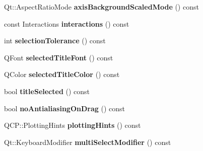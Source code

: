 \begin{DoxyCompactItemize}
\item 
\hypertarget{classQCustomPlot_a80263246f60d954ad9f1df619771d37d}{Qt\-::\-Aspect\-Ratio\-Mode {\bfseries axis\-Background\-Scaled\-Mode} () const }\label{classQCustomPlot_a80263246f60d954ad9f1df619771d37d}

\item 
\hypertarget{classQCustomPlot_aafa69792f314035ef07b8d652db9e503}{const Interactions {\bfseries interactions} () const }\label{classQCustomPlot_aafa69792f314035ef07b8d652db9e503}

\item 
\hypertarget{classQCustomPlot_a7b738074c75e80070ef6a10263c6cd69}{int {\bfseries selection\-Tolerance} () const }\label{classQCustomPlot_a7b738074c75e80070ef6a10263c6cd69}

\item 
\hypertarget{classQCustomPlot_acae05eac007969abfb8221625e4f2ab2}{Q\-Font {\bfseries selected\-Title\-Font} () const }\label{classQCustomPlot_acae05eac007969abfb8221625e4f2ab2}

\item 
\hypertarget{classQCustomPlot_a3ebc2edf63e784efe67f1873eafe8d02}{Q\-Color {\bfseries selected\-Title\-Color} () const }\label{classQCustomPlot_a3ebc2edf63e784efe67f1873eafe8d02}

\item 
\hypertarget{classQCustomPlot_a587e5d3000d2167f38fea124236082e2}{bool {\bfseries title\-Selected} () const }\label{classQCustomPlot_a587e5d3000d2167f38fea124236082e2}

\item 
\hypertarget{classQCustomPlot_ae07f2895a34d13a97a10cae4d8e17a36}{bool {\bfseries no\-Antialiasing\-On\-Drag} () const }\label{classQCustomPlot_ae07f2895a34d13a97a10cae4d8e17a36}

\item 
\hypertarget{classQCustomPlot_a130b55e205697a5288081e9fc11e443e}{Q\-C\-P\-::\-Plotting\-Hints {\bfseries plotting\-Hints} () const }\label{classQCustomPlot_a130b55e205697a5288081e9fc11e443e}

\item 
\hypertarget{classQCustomPlot_a9b6b1a0fea8da3fda6d5e3d687202877}{Qt\-::\-Keyboard\-Modifier {\bfseries multi\-Select\-Modifier} () const }\label{classQCustomPlot_a9b6b1a0fea8da3fda6d5e3d687202877}


\end{DoxyCompactItemize}
